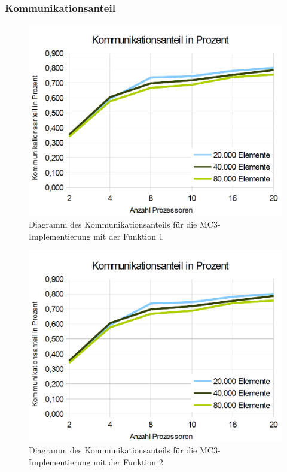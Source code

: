 \documentclass[a4paper,12pt]{scrartcl}
\begin{document}
\subsubsection{Kommunikationsanteil}
\begin{figure}[htb]
  \begin{center}
    \includegraphics[width=1\hsize]{../Kommunikationsanteil.PNG}
  \end{center}
  \caption{\label{mpikommoverhead}
    Diagramm des Kommunikationsanteils f\"ur die MC3-Implementierung mit der Funktion 1}
\end{figure}
\begin{figure}[htb]
  \begin{center}
    \includegraphics[width=1\hsize]{../Kommunikationsanteil.PNG}
  \end{center}
  \caption{\label{mpikommoverhead}
    Diagramm des Kommunikationsanteils f\"ur die MC3-Implementierung mit der Funktion 2}
\end{figure}
\end{document}
